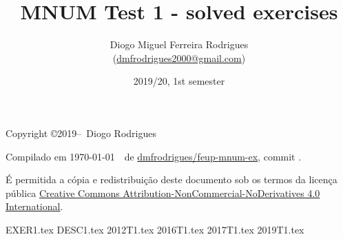 \documentclass{mnum}
\title{MNUM Test 1 - solved exercises}
\author{Diogo Miguel Ferreira Rodrigues \\ (\href{mailto:dmfrodrigues2000@gmail.com}{dmfrodrigues2000@gmail.com})}
\date{2019/20, 1st semester}
\begin{document}
\maketitle
\begin{secondpage}
    Copyright \copyright 2019--\the\year\ Diogo Rodrigues\par
    \par
    \immediate{}
    Compilado em \today~\currenttime~de \href{https://github.com/dmfrodrigues/feup-mnum-ex}{dmfrodrigues/feup-mnum-ex}, commit \unskip.\par
    É permitida a cópia e redistribuição deste documento sob os termos da licença pública
    \href{https://creativecommons.org/licenses/by-nc-nd/4.0/}{Creative Commons Attribution-NonCommercial-NoDerivatives 4.0 International}.
\end{secondpage}
\frontmatter
\tableofcontents
\mainmatter
{EXER1.tex}
{DESC1.tex}
{2012T1.tex}
{2016T1.tex}
{2017T1.tex}
{2019T1.tex}
\end{document}
